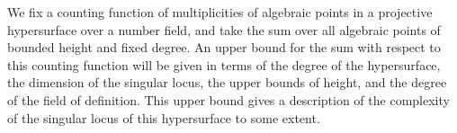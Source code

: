 
\begin{eabstract}
We fix a counting function of multiplicities of algebraic points in a projective hypersurface over a number field, and take the sum over all algebraic points of bounded height and fixed degree. An upper bound for the sum with respect to this counting function will be given in terms of the degree of the hypersurface, the dimension of the singular locus, the upper bounds of height, and the degree of the field of definition. This upper bound gives a description of the complexity of the singular locus of this hypersurface to some extent.
\end{eabstract}

